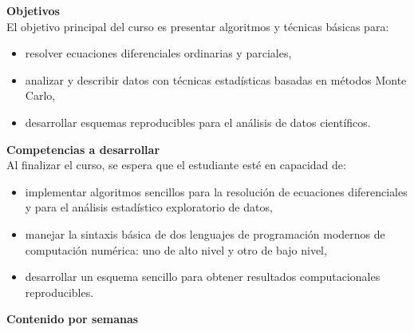 \documentclass[letterpaper,10pt,onecolumn]{article}
\begin{document}
\noindent\textbf{\large {} \quad Objetivos}\\[-0.2cm]

\noindent\normalsize El objetivo principal del curso es presentar
algoritmos y t\'ecnicas b\'asicas para:

\begin{itemize}
\item resolver ecuaciones diferenciales ordinarias y parciales, \\[-0.6cm]
\item analizar y describir datos con t\'ecnicas estad\'isticas basadas
  en m\'etodos Monte Carlo, \\[-0.6cm]
\item desarrollar esquemas reproducibles para el an\'alisis de datos cient\'ificos. \\[-0.6cm]
\end{itemize} 
\vspace*{0.5cm} 

\noindent\textbf{\large {} \quad Competencias a
  desarrollar}\\[-0.2cm] 


\noindent\normalsize Al finalizar el curso, se espera que el
estudiante est\'e en capacidad de: 

\begin{itemize}
\item implementar algoritmos sencillos para la resoluci\'on de
  ecuaciones diferenciales y para el an\'alisis estad\'istico
  exploratorio de datos, \\[-0.6cm]   
\item manejar la sintaxis b\'asica de dos lenguajes de programaci\'on
  modernos de computaci\'on num\'erica: uno de alto nivel y otro de
  bajo nivel,\\[-0.6cm]  
\item desarrollar un esquema sencillo para obtener resultados
  computacionales reproducibles.\\[-0.6cm]  
\end{itemize}

\vspace*{0.5cm} 

\noindent\textbf{\large {} \quad Contenido por
  semanas}\\[-0.2cm]  
\end{document}
